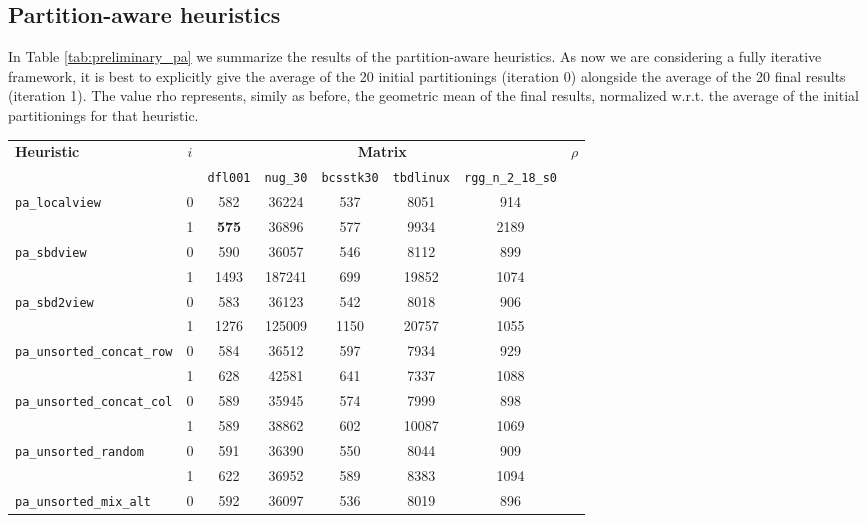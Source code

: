 \subsection{Partition-aware heuristics}

In Table \ref{tab:preliminary_pa} we summarize the results of the partition-aware heuristics. As now we are considering a fully iterative framework, it is best to explicitly give the average of the 20 initial partitionings (iteration 0) alongside the average of the 20 final results (iteration 1). The value rho represents, simily as before, the geometric mean of the final results, normalized w.r.t. the average of the initial partitionings for that heuristic. 

\begin{table}[h]
	\centering
	\renewcommand{\arraystretch}{1.2}
	\begin{tabular}{|l|c||c|c|c|c|c||c|}
		\hline
		\multirow{2}{*}{\textbf{Heuristic}} & \multirow{2}{*}{$i$} &  \multicolumn{5}{|c||}{\textbf{Matrix}} & \multirow{2}{*}{$\rho$} \\ \cline{3-7}
		& & \texttt{dfl001} & \texttt{nug\_30} & \texttt{bcsstk30} & \texttt{tbdlinux} & \texttt{rgg\_n\_2\_18\_s0} & \\ \hline
		\verb|pa_localview| & 0 & 582 & 36224 & 537 & 8051 & 914  \\ %
		& 1 & \textbf{575} & 36896 & 577 & 9934 & 2189 \\ \hline %
		\verb|pa_sbdview| & 0 & 590 & 36057 & 546 & 8112 & 899 \\ %
		& 1 & 1493 & 187241 & 699 & 19852 & 1074 \\ \hline %
	\verb|pa_sbd2view| & 0 & 583 &  36123 & 542 & 8018 & 906 \\
		& 1 & 1276 & 125009 & 1150 & 20757 & 1055\\ \hline
		\verb|pa_unsorted_concat_row| & 0 & 584 & 36512 & 597 & 7934 & 929 \\ %
		& 1 & 628 & 42581 & 641 & 7337 & 1088 \\\hline
		\verb|pa_unsorted_concat_col| & 0 & 589 & 35945 & 574 & 7999 & 898 \\ %
		& 1 & 589 & 38862 & 602 & 10087 & 1069 \\\hline
		\verb|pa_unsorted_random| & 0 & 591 & 36390 & 550 & 8044 & 909 \\ %
		& 1 & 622 & 36952 & 589 & 8383 & 1094 \\ \hline
		\verb|pa_unsorted_mix_alt| & 0 & 592 & 36097 & 536 & 8019 & 896 \\ %

\end{tabular}
\end{table}
